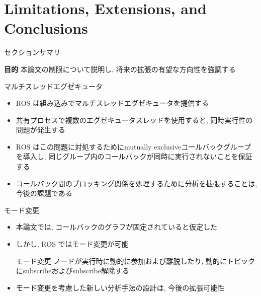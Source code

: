 
\section{Limitations, Extensions, and Conclusions}
\label{sec: limitations, extensions, and conclusions}

\begin{frame}{セクションサマリ}
    \begin{itembox}[l]{\textbf{目的}}
        本論文の制限について説明し, 将来の拡張の有望な方向性を強調する
    \end{itembox}
\end{frame}

\begin{frame}{マルチスレッドエグゼキュータ}
    \begin{itemize}
        \item ROS は組み込みでマルチスレッドエグゼキュータを提供する
        \item 共有プロセスで複数のエグゼキュータスレッドを使用すると, 同時実行性の問題が発生する
        \item ROS はこの問題に対処するためにmutually exclusiveコールバックグループを導入し, 同じグループ内のコールバックが同時に実行されないことを保証する
        \item コールバック間のブロッキング関係を処理するために分析を拡張することは, 今後の課題である
    \end{itemize}
\end{frame}

\begin{frame}{モード変更}
    \begin{itemize}
        \item 本論文では, コールバックのグラフが固定されていると仮定した
        \item しかし, ROS ではモード変更が可能
              \begin{block}{モード変更}
                  ノードが実行時に動的に参加および離脱したり, 動的にトピックにsubscribeおよびsubscribe解除する
              \end{block}
              \vspace{5mm}
        \item モード変更を考慮した新しい分析手法の設計は, 今後の拡張可能性
    \end{itemize}
\end{frame}

